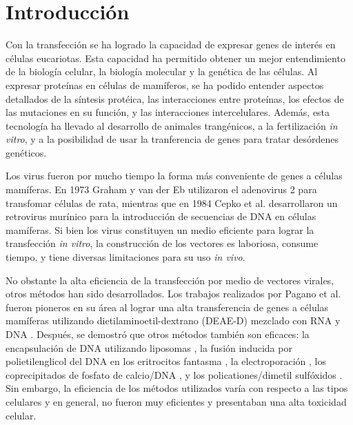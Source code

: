 \documentclass[fleqn,10pt]{SelfArx} %
\affiliation{\textsuperscript{1}\textit{Facultad de Ciencias Biológicas, Universidad Ricardo Palma, Lima, Peru}} %
\affiliation{*\textbf{Correspondencia}: jmanuel9112@icloud.com / giancuneo@gmail.com } %
\begin{document}
\flushbottom %

\maketitle %

\tableofcontents %

\thispagestyle{empty} %


\section{Introducción} 

Con la transfección se ha logrado la capacidad de expresar genes de interés en células eucariotas. Esta capacidad ha permitido obtener un mejor entendimiento de la biología celular, la biología molecular y la genética de las células. Al expresar proteínas en células de mamíferos, se ha podido entender aspectos detallados de la síntesis protéica, las interacciones entre proteínas, los efectos de las mutaciones en su función, y las interacciones intercelulares. Además, esta tecnología ha llevado al desarrollo de animales trangénicos, a la fertilización \textit{in vitro}, y a la posibilidad de usar la tranferencia de genes para tratar desórdenes genéticos.

Los virus fueron por mucho tiempo la forma más conveniente de genes a células mamíferas. En 1973 Graham y van der Eb \cite{Graham:1973aa} utilizaron el adenovirus 2 para transfomar células de rata, mientras que en 1984 Cepko et al. \cite{Cepko:1984aa} desarrollaron un retrovirus murínico para la introducción de secuencias de DNA en células mamíferas. Si bien los virus constituyen un medio eficiente para lograr la transfección \textit{in vitro}, la construcción de los vectores es laboriosa, consume tiempo, y tiene diversas limitaciones para su uso \textit{in vivo}.

No obstante la alta eficiencia de la transfección por medio de vectores virales, otros métodos han sido desarrollados. Los trabajos realizados por Pagano et al. fueron pioneros en su área al lograr una alta transferencia de genes a células mamíferas utilizando dietilaminoetil-dextrano (DEAE-D) mezclado con RNA y DNA  \cite{McCutchan:1968aa, Pagano:1967aa}. Después, se demostró que otros métodos también son eficaces: la encapsulación de DNA utilizando liposomas \cite{Fraley:1980aa, Wong:1980aa, Straubinger:1983aa, Fraley:1981aa}, la fusión inducida por polietilenglicol del DNA en los eritrocitos fantasma \cite{Straus:1980aa}, la electroporación \cite{Neumann:1982aa}, los coprecipitados de fosfato de calcio/DNA \cite{Wigler:1979aa}, y los policationes/dimetil sulfóxidos \cite{Kawai:1984aa}. Sin embargo, la eficiencia de los métodos utilizados varía con respecto a las tipos celulares y en general, no fueron muy eficientes y presentaban una alta toxicidad celular.
\end{document}
